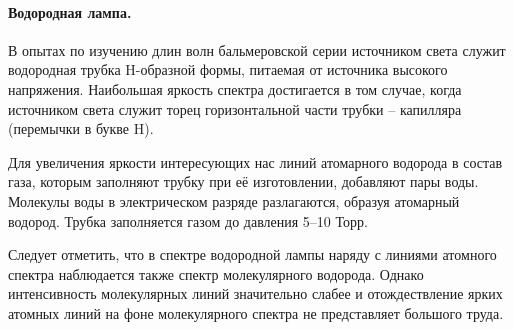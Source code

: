 \documentclass[a4paper, 12pt]{article}
\begin{document}
\paragraph{Водородная лампа.}
В опытах по изучению длин волн бальмеровской серии источником света служит водородная трубка H-образной формы, питаемая от источника высокого напряжения. Наибольшая яркость спектра достигается в том случае, когда источником света служит торец горизонтальной части трубки -- капилляра (перемычки в букве H).\par
Для увеличения яркости интересующих нас линий атомарного водорода в состав газа, которым заполняют трубку при её изготовлении, добавляют пары воды. Молекулы воды в электрическом разряде разлагаются, образуя атомарный водород. Трубка заполняется газом до давления 5--10 Торр.\par
Следует отметить, что в спектре водородной лампы наряду с линиями атомного спектра наблюдается также спектр молекулярного водорода. Однако интенсивность молекулярных линий значительно слабее и отождествление ярких атомных линий на фоне молекулярного спектра не представляет большого труда.
\end{document}
